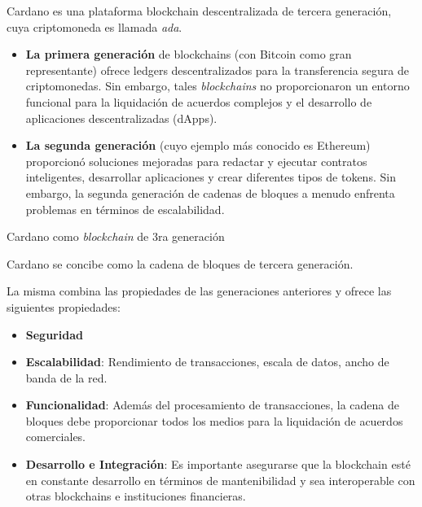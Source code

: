\documentclass{beamer}
\begin{document}
\begin{frame}
Cardano es una plataforma blockchain descentralizada de tercera generación, cuya criptomoneda es llamada \textit{ada}. 

\pause

\begin{itemize}
    \item \textbf{La primera generación} de blockchains (con Bitcoin como gran representante) ofrece ledgers descentralizados para la transferencia segura de criptomonedas. \pause Sin embargo, tales \textit{blockchains} no proporcionaron un entorno funcional para la liquidación de acuerdos complejos y el desarrollo de aplicaciones descentralizadas (dApps). 
    \pause

    \item \textbf{La segunda generación} (cuyo ejemplo más conocido es Ethereum) proporcionó soluciones mejoradas para redactar y ejecutar contratos inteligentes, desarrollar aplicaciones y crear diferentes tipos de tokens. \pause Sin embargo, la segunda generación de cadenas de bloques a menudo enfrenta problemas en términos de escalabilidad.
\end{itemize}
\end{frame}

\begin{frame}{Cardano como \textit{blockchain} de 3ra generación}

Cardano se concibe como la cadena de bloques de tercera generación.

La misma combina las propiedades de las generaciones anteriores y ofrece las siguientes propiedades:
\pause

\begin{itemize}
    \item \textbf{Seguridad}
        \pause
    \item \textbf{Escalabilidad}: Rendimiento de transacciones, escala de datos, ancho de banda de la red.
        \pause
    \item \textbf{Funcionalidad}: Además del procesamiento de transacciones, la cadena de bloques debe proporcionar todos los medios para la liquidación de acuerdos comerciales. 
        \pause
    \item \textbf{Desarrollo e Integración}: Es importante asegurarse que la blockchain esté en constante desarrollo en términos de mantenibilidad y sea interoperable con otras blockchains e instituciones financieras.
\end{itemize} 

\end{frame}
\end{document}
